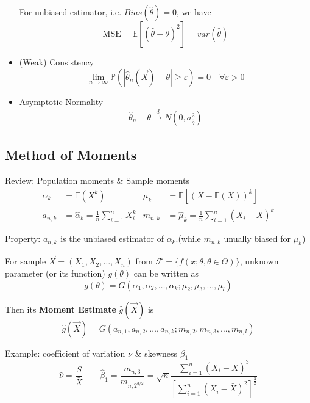 \begin{itemize}
        For unbiased estimator, i.e. $Bias(\hat{\theta})=0$, we have
        \begin{equation}
            \text{MSE}=\mathbb{E}[(\hat{\theta}-\theta)^2]=var(\hat{\theta})
        \end{equation}
        \item (Weak) Consistency
        \begin{equation}
            \lim_{n\to\infty}\mathbb{P}(|\hat{\theta }_n(\vec{X})-\theta|\geq \varepsilon)=0\quad\forall\varepsilon>0    
        \end{equation}
        \item Asymptotic Normality
        \begin{align}
            \hat{\theta }_n-\theta \xrightarrow[]{d} N(0,\sigma ^2_{\hat{\theta }}) 
        \end{align}
        
        
    \end{itemize}


\subsection{Method of Moments}\label{SubSectionMoM}
    Review: Population moments \& Sample moments
    \begin{align}
        \alpha_k&=\mathbb{E}(X^k)&\mu_k&=\mathbb{E}[(X-\mathbb{E}(X))^k]\\
        a_{n,k}&=\hat{\alpha }_k =\frac{1}{n}\sum_{i=1}^nX_i^k&m_{n,k}&=\hat{\mu }_k=\frac{1}{n}\sum_{i=1}^n(X_i-\bar{X})^k
    \end{align}

    Property: $a_{n,k}$ is the unbiased estimator of $\alpha_k$.(while $m_{n,k}$ unually biased for $\mu_k$)

    For sample $\vec{X}=(X_1,X_2,\ldots,X_n)$ from $\mathscr{F}=\{f(x;\theta,\theta\in\Theta)\}$, unknown parameter (or its function) $g(\theta)$ can be written as
    \begin{equation}
        g(\theta)=G(\alpha_1,\alpha_2,\ldots,\alpha_k;\mu_2,\mu_3,\ldots,\mu_l)    
    \end{equation}

    Then its \textbf{Moment Estimate} $\hat{g}(\vec{X})$ is
\begin{equation}
    \hat{g}(\vec{X})=G(a_{n,1},a_{n,2},\ldots,a_{n,k};m_{n,2},m_{n,3},\ldots,m_{n,l}) 
\end{equation}

    Example: coefficient of variation $ \nu $ \& skewness $ \beta _1 $
    \begin{equation}\hat{\nu}=\dfrac{S}{\bar{X}}\qquad\hat{\beta}_1=\dfrac{m_{n,3}}{m_{n,2^{3/2}}}=\sqrt{n}{\displaystyle\frac{\displaystyle{\sum_{i=1}^n(X_i-\bar{X})^3}}{\displaystyle{\left[\sum_{i=1}^n(X_i-\bar{X})^2\right]^{\frac{3}{2}}}  }}\end{equation}

